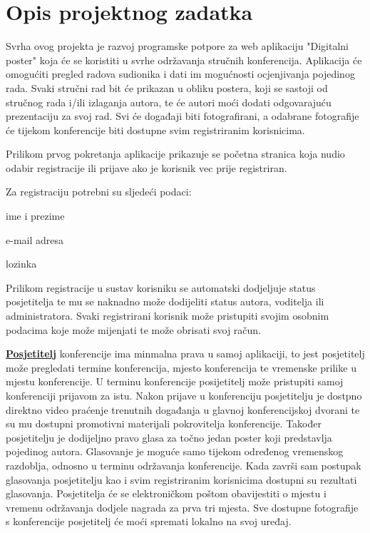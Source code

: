 \chapter{Opis projektnog zadatka}
		
		Svrha ovog projekta je razvoj programske potpore za web aplikaciju "Digitalni poster" koja će se koristiti u svrhe održavanja stručnih konferencija. Aplikacija će omogućiti pregled radova sudionika i dati im mogućnosti ocjenjivanja pojedinog rada. Svaki stručni rad bit će prikazan u obliku postera, koji se sastoji od stručnog rada i/ili izlaganja autora, te će autori moći dodati odgovarajuću prezentaciju za svoj rad. Svi će događaji biti fotografirani, a odabrane fotografije će tijekom konferencije biti dostupne svim registriranim korisnicima.

		Prilikom prvog pokretanja aplikacije prikazuje se početna stranica koja nudio odabir registracije ili prijave ako je korisnik vec prije registriran.

		Za registraciju potrebni su sljedeći podaci:

		\begin{packed_item}
			\item {ime i prezime}
			\item {e-mail adresa}
			\item {lozinka}
		\end{packed_item}
		Prilikom registracije u sustav korisniku se automatski dodjeljuje status posjetitelja te mu se naknadno može dodijeliti status autora, voditelja ili administratora. Svaki registrirani korisnik može pristupiti svojim osobnim podacima koje može mijenjati te može obrisati svoj račun.

		\textbf{\underline{Posjetitelj}} konferencije ima minmalna prava u samoj aplikaciji, to jest posjetitelj može pregledati termine konferencija, mjesto konferencija te vremenske prilike u mjestu konferencije. U terminu konferencije posijetitelj može pristupiti samoj konferenciji prijavom za istu. Nakon prijave u konferenciju posjetitelju je dostpno direktno video praćenje trenutnih događanja u glavnoj konferencijskoj dvorani te su mu dostupni promotivni materijali pokrovitelja konferencije. Također posjetitelju je dodijeljno pravo glasa za točno jedan poster koji predstavlja pojedinog autora. Glasovanje je moguće samo tijekom određenog vremenskog razdoblja, odnosno u terminu održavanja konferencije. Kada završi sam postupak glasovanja posjetitelju kao i svim registriranim korisnicima dostupni su rezultati glasovanja. Posjetitelja će se elektroničkom poštom obavijestiti o mjestu i vremenu održavanja dodjele nagrada za prva tri mjesta. Sve dostupne fotografije s konferencije posjetitelj će moći spremati lokalno na svoj uređaj.

